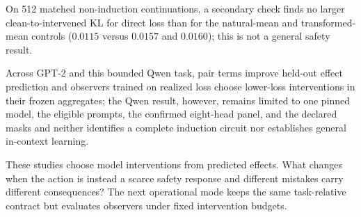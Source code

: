 On 512 matched non-induction continuations, a secondary check finds no larger
clean-to-intervened KL for direct loss than for the natural-mean and
transformed-mean controls ($0.0115$ versus $0.0157$ and $0.0160$); this is not a
general safety result.

Across GPT-2 and this bounded Qwen task, pair terms improve held-out effect
prediction and observers trained on realized loss choose lower-loss
interventions in their frozen aggregates; the Qwen result, however, remains
limited to one pinned model, the eligible prompts, the confirmed eight-head
panel, and the declared masks and neither identifies a complete induction
circuit nor establishes general in-context learning.

These studies choose model interventions from predicted effects. What changes
when the action is instead a scarce safety response and different mistakes
carry different consequences? The next operational mode keeps the same
task-relative contract but evaluates observers under fixed intervention
budgets.
